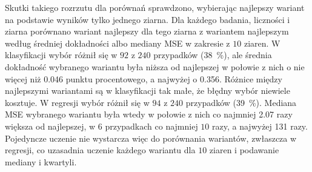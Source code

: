 Skutki takiego rozrzutu dla porównań sprawdzono, wybierając najlepszy wariant na podstawie wyników tylko jednego ziarna. Dla każdego badania, liczności i ziarna porównano wariant najlepszy dla tego ziarna z wariantem najlepszym według średniej dokładności albo mediany MSE w zakresie z $10$ ziaren. W klasyfikacji wybór różnił się w $92$ z $240$ przypadków (\qty{38}{\percent}), ale średnia dokładność wybranego wariantu była niższa od najlepszej w połowie z nich o nie więcej niż \num{0.046} punktu procentowego, a najwyżej o \num{0.356}. Różnice między najlepszymi wariantami są w klasyfikacji tak małe, że błędny wybór niewiele kosztuje. W regresji wybór różnił się w $94$ z $240$ przypadków (\qty{39}{\percent}). Mediana MSE wybranego wariantu była wtedy w połowie z nich co najmniej \num{2.07} razy większa od najlepszej, w $6$ przypadkach co najmniej $10$ razy, a najwyżej \num{131} razy. Pojedyncze uczenie nie wystarcza więc do porównania wariantów, zwłaszcza w regresji, co uzasadnia uczenie każdego wariantu dla $10$ ziaren i podawanie mediany i kwartyli.
